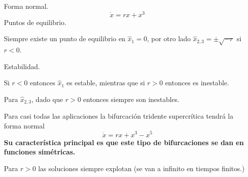 \documentclass[letterpaper]{article}
\begin{document}
\begin{tcolorbox}[colback=YellowGreen!10, colframe=YellowGreen, title=Tipos de bifurcaciones y sus características  ,fonttitle=\bfseries, center title]


Forma normal. $$
\dot{x}=rx+x^3
$$
Puntos de equilibrio.

Siempre existe un punto de equilibrio  en $\hat{x}_1=0$, por otro lado $\hat{x}_{2,3}=\pm \sqrt{-r}$ si $r<0$.

Estabilidad.

Si  $r<0$ entonces $\hat{x}_1$ es estable, mientras que si $r>0$ entonces es inestable.

Para $\hat{x}_{2,3}$, dado que $r>0$ entonces siempre son inestables.

Para casi todas las aplicaciones la bifurcación tridente supercrítica tendrá la forma normal  $$
\dot{x} =rx+x^3-x^{5}
$$
\textbf{Su característica principal es que este tipo de bifurcaciones se dan en funciones simétricas.}

Para $r>0$ las soluciones siempre explotan (se van a infinito en tiempos finitos.)

\end{tcolorbox}
\end{document}
